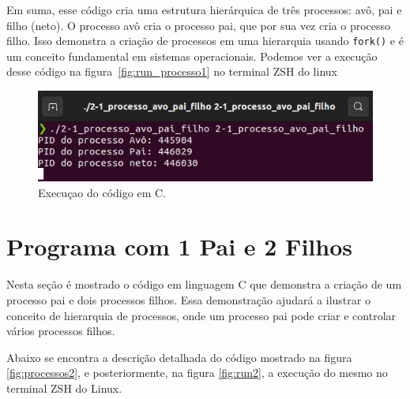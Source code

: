\documentclass[
	12pt,				%
	openright,			%
	oneside,			%
	a4paper,			%
	chapter=TITLE,		%
	english,			%
	french,				%
	spanish,			%
	brazil				%
	]{abntex2}
\theoremstyle{definition}
\begin{document}
Em suma, esse código cria uma estrutura hierárquica de três processos: avô, 
pai e filho (neto). O processo avô cria o processo pai, 
que por sua vez cria o processo filho. Isso demonstra a 
criação de processos em uma hierarquia usando \texttt{fork()} e é 
um conceito fundamental em sistemas operacionais. Podemos ver 
a execução desse código na figura~\ref{fig:run_processo1} no terminal ZSH do linux

\begin{figure}
    \centering
    \includegraphics[width=1.0\textwidth]{imagens/run_processos_1.png}
	\caption{Execuçao do código em C. }
	\label{fig:run1}
\end{figure}

\section{Programa com 1 Pai e 2 Filhos}

Nesta seção é mostrado o código em linguagem C que demonstra a 
criação de um processo pai e dois processos filhos. Essa demonstração ajudará 
a ilustrar o conceito de hierarquia de processos, onde um processo pai pode 
criar e controlar vários processos filhos.

Abaixo se encontra a descrição detalhada do código mostrado na figura \ref{fig:processos2}, e posteriormente, 
na figura \ref{fig:run2}, a execução do mesmo no terminal ZSH do Linux.
\end{document}
